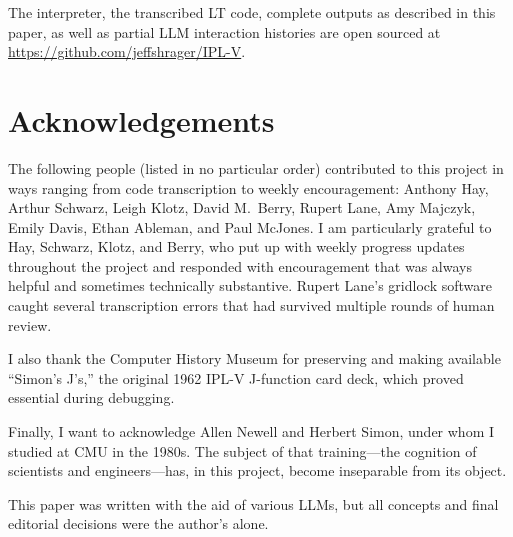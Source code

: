 \documentclass[journal]{IEEEtran}
\begin{document}
The interpreter, the transcribed LT code, complete outputs as
described in this paper, as well as partial LLM interaction histories
are open sourced at \url{https://github.com/jeffshrager/IPL-V}.

\section*{Acknowledgements}

The following people (listed in no particular order) contributed to
this project in ways ranging from code transcription to weekly
encouragement: Anthony Hay, Arthur Schwarz, Leigh Klotz, David
M.\ Berry, Rupert Lane, Amy Majczyk, Emily Davis, Ethan Ableman, and
Paul McJones. I am particularly grateful to Hay, Schwarz, Klotz, and
Berry, who put up with weekly progress updates throughout the project
and responded with encouragement that was always helpful and sometimes
technically substantive. Rupert Lane's gridlock software caught
several transcription errors that had survived multiple rounds of
human review.

I also thank the Computer History Museum for preserving and making
available ``Simon's J's,'' the original 1962 IPL-V J-function card
deck, which proved essential during debugging.

Finally, I want to acknowledge Allen Newell and Herbert Simon, under
whom I studied at CMU in the 1980s. The subject of that
training---the cognition of scientists and engineers---has, in this
project, become inseparable from its object.

{\footnotesize This paper was written with the aid of various LLMs, but all concepts
and final editorial decisions were the author's alone.}
\end{document}
